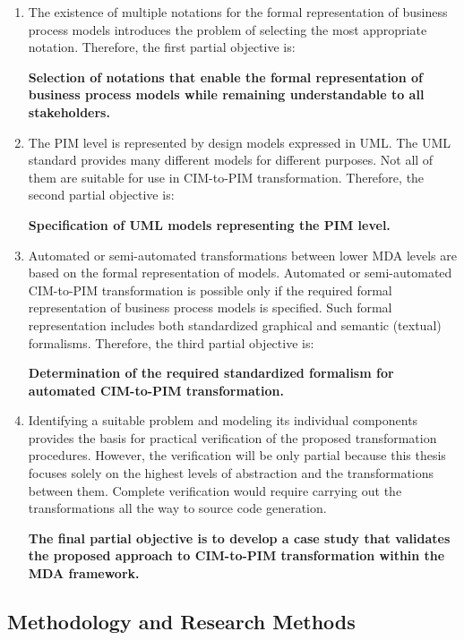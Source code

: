 \begin{enumerate} 
	\item The existence of multiple notations for the formal representation of business process models introduces the problem of selecting the most appropriate notation. Therefore, the first partial objective is: 
	
	\textbf{Selection of notations that enable the formal representation of business process models while remaining understandable to all stakeholders.} 
	
	\item The PIM level is represented by design models expressed in UML. The UML standard provides many different models for different purposes. Not all of them are suitable for use in CIM-to-PIM transformation. Therefore, the second partial objective is: 
	
	\textbf{Specification of UML models representing the PIM level.} 
	
	\item Automated or semi-automated transformations between lower MDA levels are based on the formal representation of models. Automated or semi-automated CIM-to-PIM transformation is possible only if the required formal representation of business process models is specified. Such formal representation includes both standardized graphical and semantic (textual) formalisms. Therefore, the third partial objective is: 
	
	\textbf{Determination of the required standardized formalism for automated CIM-to-PIM transformation.} 
	
	\item Identifying a suitable problem and modeling its individual components provides the basis for practical verification of the proposed transformation procedures. However, the verification will be only partial because this thesis focuses solely on the highest levels of abstraction and the transformations between them. Complete verification would require carrying out the transformations all the way to source code generation. 
	
	\textbf{The final partial objective is to develop a case study that validates the proposed approach to CIM-to-PIM transformation within the MDA framework.} 
\end{enumerate} 

\subsection{Methodology and Research Methods} 


